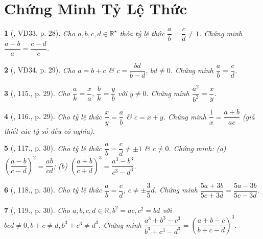 \documentclass{article}
\newtheorem{baitoan}{}
\begin{document}

\section{Chứng Minh Tỷ Lệ Thức}

\begin{baitoan}[\cite{Tuyen_Toan_7}, VD33, p. 28]
	Cho $a,b,c,d\in\mathbb{R}^\star$ thỏa tỷ lệ thức $\dfrac{a}{b} = \dfrac{c}{d}\ne 1$. Chứng minh $\dfrac{a - b}{a} = \dfrac{c - d}{c}$.
\end{baitoan}

\begin{baitoan}[\cite{Tuyen_Toan_7}, VD34, p. 29]
	Cho $a = b + c$ \& $c = \dfrac{bd}{b - d}$, $bd\ne 0$. Chứng minh $\dfrac{a}{b} = \dfrac{c}{d}$.
\end{baitoan}

\begin{baitoan}[\cite{Tuyen_Toan_7}, 115., p. 29]
	Cho $\dfrac{a}{k} = \dfrac{x}{a}$, $\dfrac{b}{k} = \dfrac{y}{b}$ với $y\ne 0$. Chứng minh $\dfrac{a^2}{b^2} = \dfrac{x}{y}$.
\end{baitoan}

\begin{baitoan}[\cite{Tuyen_Toan_7}, 116., p. 29]
	Cho tỷ lệ thức $\dfrac{x}{y} = \dfrac{a}{b}$ \& $c = x + y$. Chứng minh $\dfrac{1}{x} = \dfrac{a + b}{ac}$ (giả thiết các tỷ số đều có nghĩa).
\end{baitoan}

\begin{baitoan}[\cite{Tuyen_Toan_7}, 117., p. 30]
	Cho tỷ lệ thức $\dfrac{a}{b} = \dfrac{c}{d}\ne\pm 1$ \& $c\ne 0$. Chứng minh: (a) $\left(\dfrac{a - b}{c - d}\right)^2 = \dfrac{ab}{cd}$;
	(b) $\left(\dfrac{a + b}{c + d}\right)^3 = \dfrac{a^3 - b^3}{c^3 - d^3}$.	
\end{baitoan}

\begin{baitoan}[\cite{Tuyen_Toan_7}, 118., p. 30]
	Cho tỷ lệ thức $\dfrac{a}{b} = \dfrac{c}{d}$, $c\ne\pm\dfrac{3}{5}d$. Chứng minh $\dfrac{5a + 3b}{5c + 3d} = \dfrac{5a - 3b}{5c - 3d}$.
\end{baitoan}

\begin{baitoan}[\cite{Tuyen_Toan_7}, 119., p. 30]
	Cho $a,b,c,d\in\mathbb{R},b^2 = ac,c^2 = bd$ với $bcd\ne 0,b + c\ne d,b^3 + c^3\ne d^3$. Chứng minh $\dfrac{a^3 + b^3 - c^3}{b^3 + c^3 - d^3} = \left(\dfrac{a + b - c}{b + c - d}\right)^3$.
\end{baitoan}
\end{document}
